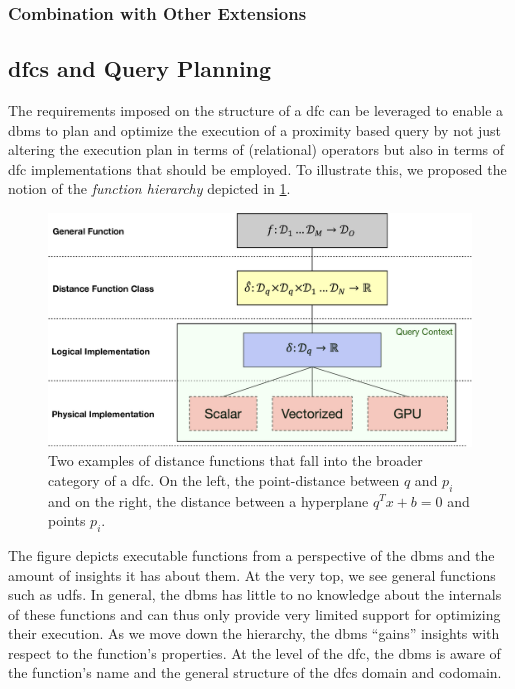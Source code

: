 
\subsubsection{Combination with Other Extensions}


\subsection{\texorpdfstring{\acrshort{dfc}s}{DFCs} and Query Planning}
\label{section:dfc_and_planning}

The requirements imposed on the structure of a \acrshort{dfc} can be leveraged to enable a \acrshort{dbms} to plan and optimize the execution of a proximity based query by not just altering the execution plan in terms of (relational) operators but also in terms of \acrshort{dfc} implementations that should be employed. To illustrate this, we proposed the notion of the \emph{function hierarchy} depicted in \ref{figure:function_hierarchy}.

\begin{figure}[bt]
    \centering
    \includegraphics[width=\textwidth]{figures/function_hierarchy.eps}
    \caption{Two examples of distance functions that fall into the broader category of a \acrshort{dfc}. On the left, the point-distance between $q$ and $p_i$ and on the right, the distance between a hyperplane $q^Tx+b = 0$ and points $p_i$.}
    \label{figure:function_hierarchy}
\end{figure}

The figure depicts executable functions from a perspective of the \acrshort{dbms} and the amount of insights it has about them. At the very top, we see general functions such as \acrshort{udf}s. In general, the \acrshort{dbms} has little to no knowledge about the internals of these functions and can thus only provide very limited support for optimizing their execution. As we move down the hierarchy, the \acrshort{dbms} ``gains'' insights with respect to the function's properties. At the level of the \acrshort{dfc}, the \acrshort{dbms} is aware of the function's name and the general structure of the \acrshort{dfc}s domain and codomain. 


